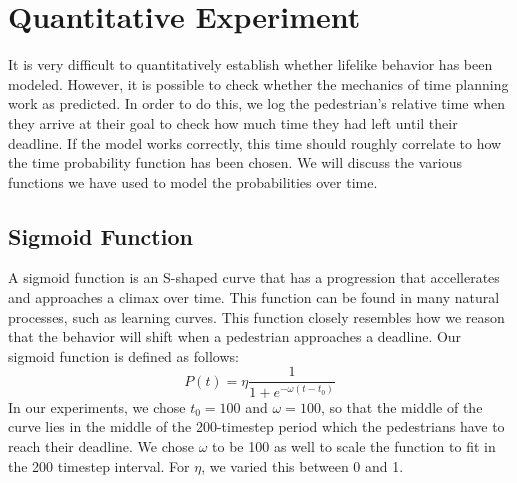 \documentclass[11pt]{book}
\begin{document}
\section{Quantitative Experiment}
It is very difficult to quantitatively establish whether lifelike behavior has been modeled. However, it is possible to check whether the mechanics of time planning work as predicted. In order to do this, we log the pedestrian's relative time when they arrive at their goal to check how much time they had left until their deadline. If the model works correctly, this time should roughly correlate to how the time probability function has been chosen. We will discuss the various functions we have used to model the probabilities over time.

\subsection{Sigmoid Function}
A sigmoid function is an S-shaped curve that has a progression that accellerates and approaches a climax over time. This function can be found in many natural processes, such as learning curves. This function closely resembles how we reason that the behavior will shift when a pedestrian approaches a deadline.
Our sigmoid function is defined as follows:
\begin{equation}
P(t) = \eta \frac{1}{1+e^{-\omega(t-t_0)}}
\end{equation}
In our experiments, we chose $t_0=100$ and $\omega=100$, so that the middle of the curve lies in the middle of the 200-timestep period which the pedestrians have to reach their deadline. We chose $\omega$ to be 100 as well to scale the function to fit in the 200 timestep interval. For $\eta$, we varied this between 0 and 1.

\end{document}
